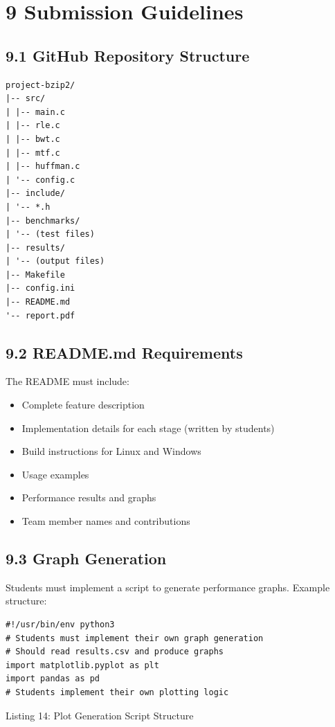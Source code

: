 \documentclass[10pt]{article}
\begin{document}
\section*{9 Submission Guidelines}
\subsection*{9.1 GitHub Repository Structure}
\begin{verbatim}
project-bzip2/
|-- src/
| |-- main.c
| |-- rle.c
| |-- bwt.c
| |-- mtf.c
| |-- huffman.c
| '-- config.c
|-- include/
| '-- *.h
|-- benchmarks/
| '-- (test files)
|-- results/
| '-- (output files)
|-- Makefile
|-- config.ini
|-- README.md
'-- report.pdf
\end{verbatim}

\subsection*{9.2 README.md Requirements}
The README must include:

\begin{itemize}
  \item Complete feature description
  \item Implementation details for each stage (written by students)
  \item Build instructions for Linux and Windows
  \item Usage examples
  \item Performance results and graphs
  \item Team member names and contributions
\end{itemize}

\subsection*{9.3 Graph Generation}
Students must implement a script to generate performance graphs. Example structure:

\begin{verbatim}
#!/usr/bin/env python3
# Students must implement their own graph generation
# Should read results.csv and produce graphs
import matplotlib.pyplot as plt
import pandas as pd
# Students implement their own plotting logic
\end{verbatim}

Listing 14: Plot Generation Script Structure
\end{document}

